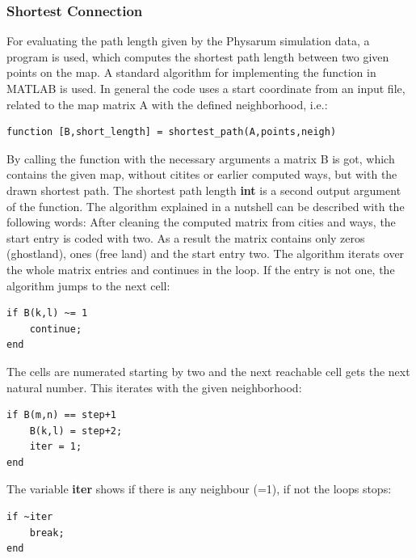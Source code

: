 \documentclass[11pt]{scrartcl}
\begin{document}
\subsubsection{Shortest Connection}
\label{sec:shortest_connection}
For evaluating the path length given by the Physarum simulation data, a program is used, which computes the shortest path length between two given points on the map. A standard algorithm \cite{gaertner2010} for implementing the function in MATLAB is used. In general the code uses a start coordinate from an input file, related to the map matrix A with the defined neighborhood, i.e.:

\begin{lstlisting}
function [B,short_length] = shortest_path(A,points,neigh)
\end{lstlisting}

\null

By calling the function with the necessary arguments a matrix B is got, which contains the given map, without citites or earlier computed ways, but with the drawn shortest path. The shortest path length \textbf{int} is a second output argument of the function. The algorithm explained in a nutshell can be described with the following words: After cleaning the computed matrix from cities and ways, the start entry is coded with two. As a result the matrix contains only zeros (ghostland), ones (free land) and the start entry two. The algorithm iterats over the whole matrix entries and continues in the loop. If the entry is not one, the algorithm jumps to the next cell:

\begin{lstlisting}
if B(k,l) ~= 1
	continue;
end
\end{lstlisting}

\null

The cells are numerated starting by two and the next reachable cell gets the next natural number. This iterates with the given neighborhood:

\begin{lstlisting}
if B(m,n) == step+1
	B(k,l) = step+2;
	iter = 1;
end
\end{lstlisting}

\null

The variable \textbf{iter} shows if there is any neighbour (=1), if not the loops stops:

\begin{lstlisting}
if ~iter
	break;
end
\end{lstlisting}
\end{document}
